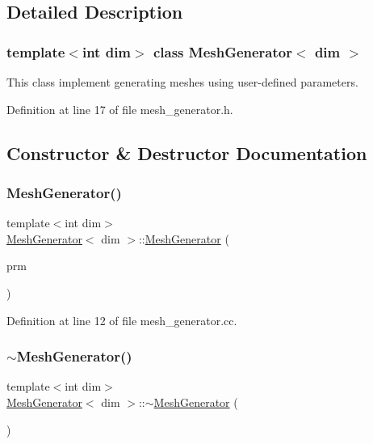 \subsection{Detailed Description}
\subsubsection*{template$<$int dim$>$\newline
class Mesh\+Generator$<$ dim $>$}

This class implement generating meshes using user-\/defined parameters. 

Definition at line 17 of file mesh\+\_\+generator.\+h.



\subsection{Constructor \& Destructor Documentation}
\mbox{\label{class_mesh_generator_aaf711e4f4d1702dd2f91b8dc3d425765}} 
\subsubsection{\texorpdfstring{Mesh\+Generator()}{MeshGenerator()}}
{\footnotesize\ttfamily template$<$int dim$>$ \\
\hyperlink{class_mesh_generator}{Mesh\+Generator}$<$ dim $>$\+::\hyperlink{class_mesh_generator}{Mesh\+Generator} (\begin{DoxyParamCaption}\item[{Parameter\+Handler \&}]{prm }\end{DoxyParamCaption})}



Definition at line 12 of file mesh\+\_\+generator.\+cc.

\mbox{\label{class_mesh_generator_aa8a590f00d9732424e56f54bcc2b6339}} 
\subsubsection{\texorpdfstring{$\sim$\+Mesh\+Generator()}{~MeshGenerator()}}
{\footnotesize\ttfamily template$<$int dim$>$ \\
\hyperlink{class_mesh_generator}{Mesh\+Generator}$<$ dim $>$\+::$\sim$\hyperlink{class_mesh_generator}{Mesh\+Generator} (\begin{DoxyParamCaption}{ }\end{DoxyParamCaption})}



